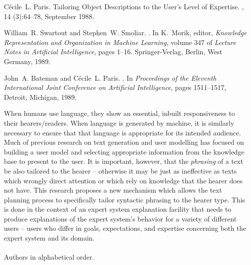 \begin{thebibliography}{10}
\noindent\hspace*{\itemindent}{\leftskip=0.1in\rightskip=0.1in\hrulefill}

C\'{e}cile~L. Paris.
\newblock Tailoring {O}bject {D}escriptions to the {U}ser's {L}evel of
  {E}xpertise.
, 14 (3):64--78, September 1988.

\noindent\hspace*{\itemindent}{\leftskip=0.1in\rightskip=0.1in\hrulefill}

William~R. Swartout and Stephen~W. Smoliar.
.
\newblock In K.~Morik, editor, {\em Knowledge Representation and Organization
  in Machine Learning}, volume 347 of {\em Lecture Notes in Artificial
  Intelligence}, pages 1--16. Springer-Verlag, Berlin, West Germany, 1989.

\noindent\hspace*{\itemindent}{\leftskip=0.1in\rightskip=0.1in\hrulefill}


John~A. Bateman and C\'{e}cile~L. Paris.
.
\newblock In {\em Proceedings of the Eleventh International Joint Conference on
  Artificial Intelligence}, pages 1511--1517, Detroit, Michigan, 1989.

{\leftskip=0.1in\rightskip=0.1in\begin{small}\par{}When
  humans use language, they show an essential, inbuilt responsiveness to their
  hearers/readers. When language is generated by machine, it is similarly
  necessary to ensure that that language is appropriate for its intended
  audience. Much of previous research on text generation and user modelling has
  focused on building a user model and selecting appropriate information from
  the knowledge base to present to the user. It is important, however, that the
  {\em phrasing\/} of a text be also tailored to the hearer -- otherwise it may
  be just as ineffective as texts which wrongly direct attention or which rely
  on knowledge that the hearer does not have. This research proposes a new
  mechanism which allows the text planning process to specifically tailor
  syntactic phrasing to the hearer type. This is done in the context of an
  expert system explanation facility that needs to produce explanations of the
  expert system's behavior for a variety of different users -- users who differ
  in goals, expectations, and expertise concerning both the expert system and
  its domain.\\ \\Authors in alphabetical order.\end{small}\par}
\noindent\hspace*{\itemindent}{\leftskip=0.1in\rightskip=0.1in\hrulefill}


\end{thebibliography}
